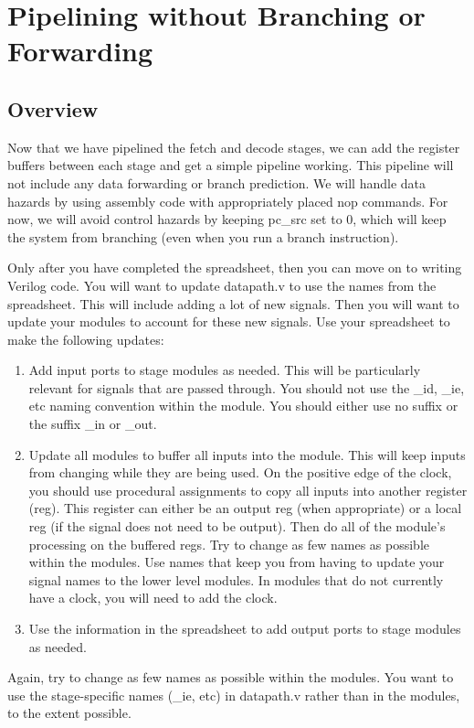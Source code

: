 \chapter{Pipelining without Branching or Forwarding}


\section{Overview}
Now that we have pipelined the fetch and decode stages, we can add the register buffers between each stage and get a simple pipeline working.  This pipeline will not include any data forwarding or branch prediction.  We will handle data hazards by using assembly code with appropriately placed nop commands.  For now, we will avoid control hazards by keeping pc\_src set to 0, which will keep the system from branching (even when you run a branch instruction).  

Only after you have completed the spreadsheet, then you can move on to writing Verilog code.  You will want to update datapath.v to use the names from the spreadsheet.  This will include adding a lot of new signals.  Then you will want to update your modules to account for these new signals.  Use your spreadsheet to make the following updates:
\begin{enumerate}
	\item Add input ports to stage modules as needed.  This will be particularly relevant for signals that are passed through.  You should not use the \_id, \_ie, etc naming convention within the module.  You should either use no suffix or the suffix \_in or \_out.
	\item Update all modules to buffer all inputs into the module.  This will keep inputs from changing while they are being used.  On the positive edge of the clock, you should use procedural assignments to copy all inputs into another register (reg).  This register can either be an output reg (when appropriate) or a local reg (if the signal does not need to be output).  Then do all of the module's processing on the buffered regs.  Try to change as few names as possible within the modules.  Use names that keep you from having to update your signal names to the lower level modules.  In modules that do not currently have a clock, you will need to add the clock.
	\item Use the information in the spreadsheet to add output ports to stage modules as needed. 
\end{enumerate}
Again, try to change as few names as possible within the modules.  You want to use the stage-specific names (\_ie, etc) in datapath.v rather than in the modules, to the extent possible.

